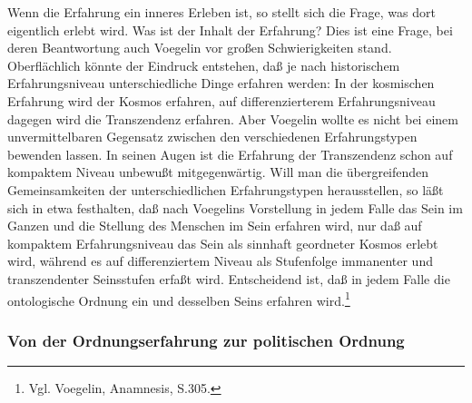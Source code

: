 Wenn die Erfahrung ein inneres Erleben ist, so stellt sich die Frage,
was dort eigentlich erlebt wird. Was ist der Inhalt der Erfahrung? Dies
ist eine Frage, bei deren Beantwortung auch Voegelin vor großen
Schwierigkeiten stand.  Oberflächlich könnte der Eindruck entstehen, daß
je nach historischem Erfahrungsniveau unterschiedliche Dinge erfahren
werden: In der kosmischen Erfahrung wird der Kosmos erfahren, auf
differenzierterem Erfahrungsniveau dagegen wird die Transzendenz
erfahren. Aber Voegelin wollte es nicht bei einem unvermittelbaren
Gegensatz zwischen den verschiedenen Erfahrungstypen bewenden lassen. In
seinen Augen ist die Erfahrung der Transzendenz schon auf kompaktem
Niveau unbewußt mitgegenwärtig. Will man die übergreifenden
Gemeinsamkeiten der unterschiedlichen Erfahrungstypen herausstellen, so
läßt sich in etwa festhalten, daß nach Voegelins Vorstellung in jedem
Falle das Sein im Ganzen und die Stellung des Menschen im Sein erfahren
wird, nur daß auf kompaktem Erfahrungsniveau das Sein als sinnhaft
geordneter Kosmos erlebt wird, während es auf differenziertem Niveau als
Stufenfolge immanenter und transzendenter Seinsstufen erfaßt wird.
Entscheidend ist, daß in jedem Falle die ontologische Ordnung ein und
desselben Seins erfahren wird.\footnote{Vgl. Voegelin, Anamnesis,
  S.305.}

\subsubsection{Von der Ordnungserfahrung zur politischen Ordnung}

